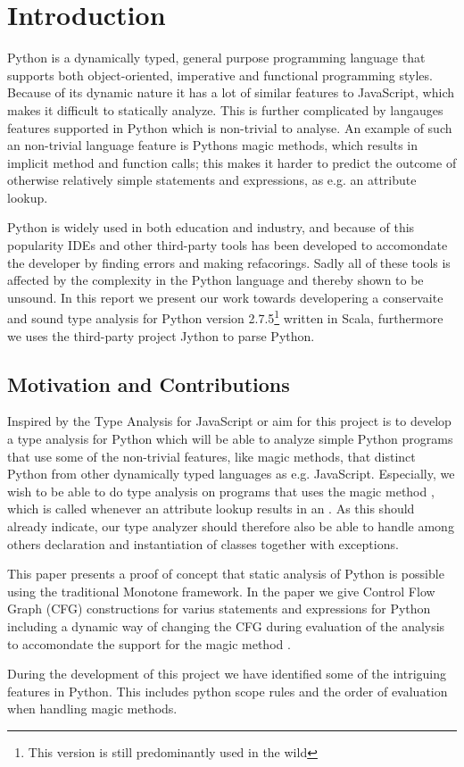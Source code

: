 \chapter{Introduction}
Python is a dynamically typed, general purpose programming language that supports both object-oriented, imperative and functional programming styles. Because of its dynamic nature it has a lot of similar features to JavaScript, which makes it difficult to statically analyze. This is further complicated by langauges features supported in Python which is non-trivial to analyse. An example of such an non-trivial language feature is Pythons magic methods, which results in implicit method and function calls; this makes it harder to predict the outcome of otherwise relatively simple statements and expressions, as e.g. an attribute lookup.

Python is widely used in both education and industry, and because of this popularity IDEs\cite{ide.appcelerator, ide.jetbrains, ide.wingware} and other third-party tools\cite{tool.pep8, tool.pyflakes, tool.pychecker, tool.pylint} has been developed to accomondate the developer by finding errors and making refacorings. Sadly all of these tools is affected by the complexity in the Python language and thereby shown to be unsound\cite{lamdapy}. In this report we present our work towards developering a conservaite and sound type analysis for Python version 2.7.5\footnote{This version is still predominantly used in the wild} written in Scala, furthermore we uses the third-party project Jython\cite{jython} to parse Python.

\section{Motivation and Contributions}
Inspired by the Type Analysis for JavaScript\cite{tajs} or aim for this project is to develop a type analysis for Python which will be able to analyze simple Python programs that use some of the non-trivial features, like magic methods, that distinct Python from other dynamically typed languages as e.g. JavaScript. Especially, we wish to be able to do type analysis on programs that uses the magic method , which is called whenever an attribute lookup results in an . As this should already indicate, our type analyzer should therefore also be able to handle among others declaration and instantiation of classes together with exceptions.

This paper presents a proof of concept that static analysis of Python is possible using the traditional Monotone framework. In the paper we give Control Flow Graph (CFG) constructions for varius statements and expressions for Python including a dynamic way of changing the CFG during evaluation of the analysis to accomondate the support for the magic method .  

During the development of this project we have identified some of the intriguing features in Python. This includes python scope rules and the order of evaluation when handling magic methods.